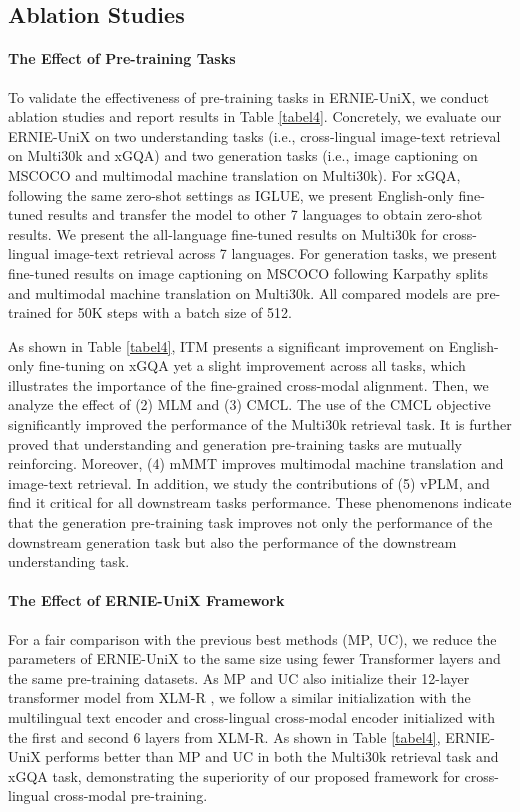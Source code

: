 \documentclass{article}
\begin{document}
\subsection{Ablation Studies}
\paragraph{The Effect of Pre-training Tasks}
To validate the effectiveness of pre-training tasks in ERNIE-UniX, we conduct ablation studies and report results in Table \ref{tabel4}. Concretely, we evaluate our ERNIE-UniX on two understanding tasks (i.e.,  cross-lingual image-text retrieval on Multi30k and xGQA) and two generation tasks (i.e., image captioning on MSCOCO and multimodal machine translation on Multi30k). For xGQA, following the same zero-shot settings as IGLUE, we present English-only fine-tuned results and transfer the model to other 7 languages to obtain zero-shot results. We present the all-language fine-tuned results on Multi30k for cross-lingual image-text retrieval across 7 languages. For generation tasks, we present fine-tuned results on image captioning on MSCOCO following Karpathy splits and multimodal machine translation on Multi30k. All compared models are pre-trained for 50K steps with a batch size of 512.

As shown in Table \ref{tabel4}, ITM presents a significant improvement on English-only fine-tuning on xGQA yet a slight improvement across all tasks, which illustrates the importance of the fine-grained cross-modal alignment. Then, we analyze the effect of (2) MLM and (3) CMCL. The use of the CMCL objective significantly improved the performance of the Multi30k retrieval task. It is further proved that understanding and generation pre-training tasks are mutually reinforcing. Moreover, (4) mMMT improves multimodal machine translation and image-text retrieval. In addition, we study the contributions of (5) vPLM, and find it critical for all downstream tasks performance. These phenomenons indicate that the generation pre-training task improves not only the performance of the downstream generation task but also the performance of the downstream understanding task. 

\paragraph{The Effect of ERNIE-UniX Framework}
For a fair comparison with the previous best methods (MP, UC), we reduce the parameters of ERNIE-UniX to the same size using fewer Transformer layers and the same pre-training datasets. As MP and UC also initialize their 12-layer transformer model from XLM-R \cite{xlmr2019}, we follow a similar initialization with the multilingual text encoder and cross-lingual cross-modal encoder initialized with the first and second 6 layers from XLM-R. As shown in Table \ref{tabel4}, ERNIE-UniX performs better than MP and UC in both the Multi30k retrieval task and xGQA task, demonstrating the superiority of our proposed framework for cross-lingual cross-modal pre-training. 
\end{document}
